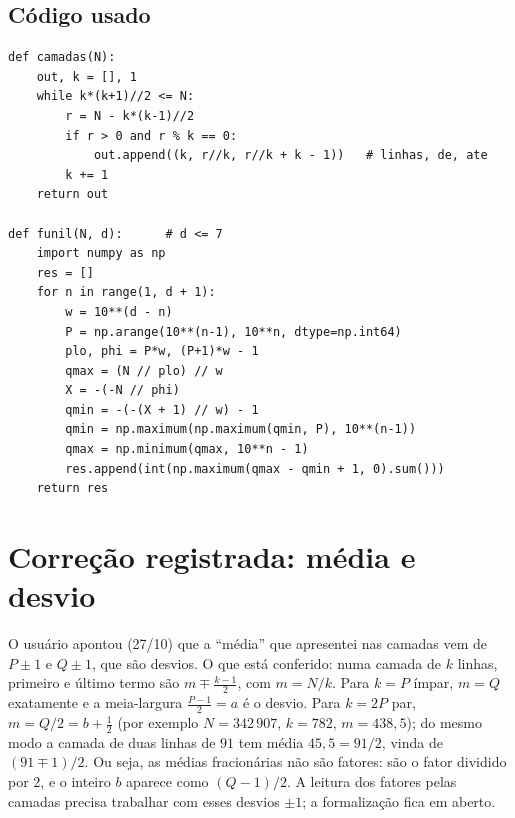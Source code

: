 \documentclass[11pt,a4paper]{article}
\begin{document}
\subsection{Código usado}
\begin{verbatim}
def camadas(N):
    out, k = [], 1
    while k*(k+1)//2 <= N:
        r = N - k*(k-1)//2
        if r > 0 and r % k == 0:
            out.append((k, r//k, r//k + k - 1))   # linhas, de, ate
        k += 1
    return out

def funil(N, d):      # d <= 7
    import numpy as np
    res = []
    for n in range(1, d + 1):
        w = 10**(d - n)
        P = np.arange(10**(n-1), 10**n, dtype=np.int64)
        plo, phi = P*w, (P+1)*w - 1
        qmax = (N // plo) // w
        X = -(-N // phi)
        qmin = -(-(X + 1) // w) - 1
        qmin = np.maximum(np.maximum(qmin, P), 10**(n-1))
        qmax = np.minimum(qmax, 10**n - 1)
        res.append(int(np.maximum(qmax - qmin + 1, 0).sum()))
    return res
\end{verbatim}

\section{Correção registrada: média e desvio}
O usuário apontou (27/10) que a ``média'' que apresentei nas camadas vem de $P\pm1$ e $Q\pm1$, que são desvios. O que está conferido: numa camada de $k$ linhas, primeiro e último termo são $m\mp\tfrac{k-1}{2}$, com $m=N/k$. Para $k=P$ ímpar, $m=Q$ exatamente e a meia-largura $\tfrac{P-1}{2}=a$ é o desvio. Para $k=2P$ par, $m=Q/2=b+\tfrac12$ (por exemplo $N=342\,907$, $k=782$, $m=438{,}5$); do mesmo modo a camada de duas linhas de $91$ tem média $45{,}5=91/2$, vinda de $(91\mp1)/2$. Ou seja, as médias fracionárias não são fatores: são o fator dividido por $2$, e o inteiro $b$ aparece como $(Q-1)/2$. A leitura dos fatores pelas camadas precisa trabalhar com esses desvios $\pm1$; a formalização fica em aberto.
\end{document}
